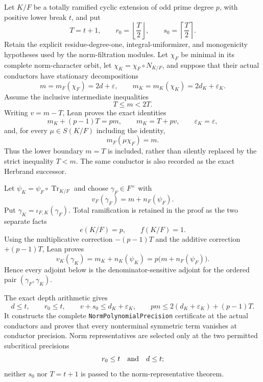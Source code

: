 \begin{theorem}
\label{mod:parameters-highintermediate}
Let $K/F$ be a totally ramified cyclic extension of odd prime degree
$p$, with positive lower break $t$, and put
\[
 T=t+1,\qquad r_0=\left\lfloor\frac T2\right\rfloor,
 \qquad s_0=\left\lceil\frac T2\right\rceil.
\]
Retain the explicit residue-degree-one, integral-uniformizer, and
monogenicity hypotheses used by the norm-filtration modules.  Let
$\chi_F$ be minimal in its complete norm-character orbit, let
$\chi_K=\chi_F\circ N_{K/F}$, and suppose that their actual conductors have
stationary decompositions
\[
 m=m_F(\chi_F)=2d+\varepsilon,
 \qquad m_K=m_K(\chi_K)=2d_K+\varepsilon_K.
\]
Assume the inclusive intermediate inequalities
\[
 T\le m<2T.
\]
Writing $v=m-T$, Lean proves the exact identities
\[
 m_K+(p-1)T=pm,
 \qquad m_K=T+pv,
 \qquad \varepsilon_K=\varepsilon,
\]
and, for every $\mu\in S(K/F)$ including the identity,
\[
 m_F(\mu\chi_F)=m.
\]
Thus the lower boundary $m=T$ is included, rather than silently replaced
by the strict inequality $T<m$.  The same conductor is also recorded as
the exact Herbrand successor.

Let $\psi_K=\psi_F\circ\operatorname{Tr}_{K/F}$ and choose
$\gamma_F\in F^\times$ with
\[
 v_F(\gamma_F)=m+n_F(\psi_F).
\]
Put $\gamma_K=\iota_{F,K}(\gamma_F)$.  Total ramification is retained in
the proof as the two separate facts
\[
 e(K/F)=p,\qquad f(K/F)=1.
\]
Using the multiplicative correction $-(p-1)T$ and the additive correction
$+(p-1)T$, Lean proves
\[
 v_K(\gamma_K)=m_K+n_K(\psi_K)
              =p\bigl(m+n_F(\psi_F)\bigr).
\]
Hence every adjoint below is the denominator-sensitive adjoint for the
ordered pair $(\gamma_F,\gamma_K)$.

The exact depth arithmetic gives
\[
 d\le t,\qquad r_0\le t,
 \qquad v+s_0\le d_K+\varepsilon_K,
 \qquad p m\le2(d_K+\varepsilon_K)+(p-1)T.
\]
It constructs the complete \texttt{NormPolynomialPrecision} certificate
at the actual conductors and proves that every nonterminal symmetric term
vanishes at conductor precision.  Norm representatives are selected only
at the two permitted subcritical precisions
\[
 r_0\le t\quad\hbox{and}\quad d\le t;
\]
neither $s_0$ nor $T=t+1$ is passed to the norm-representative theorem.


\end{theorem}
